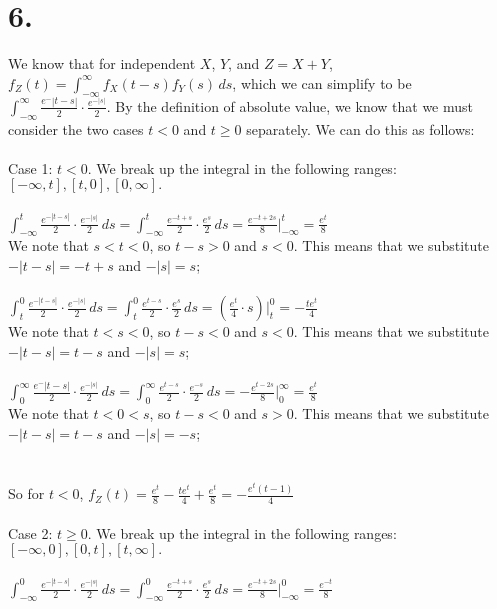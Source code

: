 \documentclass{article}
\begin{document}
\section*{6.}
{\Large 
We know that for independent $X$, $Y$, and $Z = X + Y$, $f_Z(t) = \int_{-\infty}^{\infty}f_X(t - s)f_Y(s) \,ds$, which we can simplify to be $\int_{-\infty}^{\infty} \frac{e^-{|t-s|}}{2} \cdot \frac{e^{-|s|}}{2}$. By the definition of absolute value, we know that we must consider the two cases $t < 0$ and $t \geq 0$ separately. We can do this as follows: \\ \\ 
Case 1: $t < 0$. We break up the integral in the following ranges: $[-\infty, t], [t, 0], [0, \infty].$ \\ \\
$\int_{-\infty}^{t} \frac{e^{-|t-s|}}{2} \cdot \frac{e^{-|s|}}{2} \,ds = \int_{-\infty}^{t} \frac{e^{-t+s}}{2} \cdot \frac{e^{s}}{2} \,ds = \frac{e^{-t + 2s}}{8} |_{-\infty}^{t} = \frac{e^{t}}{8}$ \\ 
We note that $s < t < 0$, so $t - s > 0$ and $s < 0$. This means that we substitute $-|t-s| = -t + s$ and $-|s| = s$; \\ \\ 
$\int_{t}^{0} \frac{e^{-|t-s|}}{2} \cdot \frac{e^{-|s|}}{2} \,ds = \int_{t}^{0} \frac{e^{t-s}}{2} \cdot \frac{e^{s}}{2} \,ds = (\frac{e^{t}}{4} \cdot s) |_{t}^{0} = -\frac{te^{t}}{4}$ \\ 
We note that $t < s < 0$, so $t - s < 0$ and $s < 0$. This means that we substitute $-|t-s| = t - s$ and $-|s| = s$; \\ \\ 
$\int_{0}^{\infty} \frac{e^-{|t-s|}}{2} \cdot \frac{e^{-|s|}}{2} \,ds = \int_{0}^{\infty} \frac{e^{t-s}}{2} \cdot \frac{e^{-s}}{2} \,ds = -\frac{e^{t - 2s}}{8} |_{0}^{\infty} = \frac{e^{t}}{8}$ \\ 
We note that $t < 0 < s$, so $t - s < 0$ and $s > 0$. This means that we substitute $-|t-s| = t - s$ and $-|s| = -s$; \\  \\ \\
So for $t < 0$, $f_Z(t) = \frac{e^t}{8} - \frac{te^t}{4} + \frac{e^t}{8} = -\frac{e^t(t - 1)}{4}$
\\ \\ 
Case 2: $t \geq 0$. We break up the integral in the following ranges: $[-\infty, 0], [0, t], [t, \infty].$ \\ \\ 
$\int_{-\infty}^{0} \frac{e^{-|t-s|}}{2} \cdot \frac{e^{-|s|}}{2} \,ds = \int_{-\infty}^{0} \frac{e^{-t+s}}{2} \cdot \frac{e^{s}}{2} \,ds = \frac{e^{-t + 2s}}{8} |_{-\infty}^{0} = \frac{e^{-t}}{8}$ \\ 
}
\end{document}
